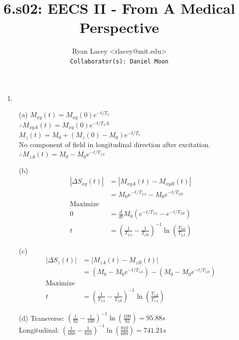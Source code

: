 \documentclass{article}
\begin{document}

\title{6.s02: EECS II - From A Medical Perspective}
\author{
  Ryan Lacey <rlacey@mit.edu>\\
  \footnotesize \texttt{Collaborator(s): Daniel Moon}
}
        
\maketitle
        

\begin{enumerate}
\item[1.]
	\begin{enumerate}
	\item[(a)]
	$M_{xy}(t) = M_{xy}(0)e^{-t/T_2}$\\
	$\therefore M_{xyA}(t) = M_{xy}(0)e^{-t/T_2A}$\\
	
	$M_z(t) = M_0 + (M_z(0) - M_0)e^{-t/T_1}$\\
	No component of field in longitudinal direction after  excitation.\\
	$\therefore M_{zA}(t) = M_0 - M_0 e^{-t/T_{1A}}$\\

	\item[(b)]
\begin{align*}
|\Delta S_{xy}(t)| &= |M_{xyA}(t) - M_{xyB}(t)|\\
&= M_{0} e^{-t/T_{2A}} - M_{0} e^{-t/T_{2B}}\\
\text{Maximize}&\\
0 &= \frac{d}{dt} M_{0} \left(e^{-t/T_{2A}} - e^{-t/T_{2B}} \right)\\
t &= \left( \frac{1}{T_{2A}} - \frac{1}{T_{2B}} \right)^{-1} \ln \left( \frac{T_{2B}}{T_{2A}} \right)
\end{align*}

	\item[(c)]
\begin{align*}
|\Delta S_{z}(t)| &= |M_{zA}(t) - M_{zB}(t)|\\
&= \left(M_0 - M_0 e^{-t/T_{1A}} \right) - \left( M_0 - M_0 e^{-t/T_{1B}} \right)\\
\text{Maximize}&\\
t &= \left( \frac{1}{T_{1A}} - \frac{1}{T_{1B}} \right)^{-1} \ln \left( \frac{T_{1B}}{T_{1A}} \right)
\end{align*}

	\item[(d)]
	Transverse: $\left( \frac{1}{92} - \frac{1}{100} \right)^{-1} \ln \left( \frac{100}{92} \right) = 95.88s$\\
	Longitudinal: $\left( \frac{1}{680} - \frac{1}{810} \right)^{-1} \ln \left( \frac{810}{680} \right) = 741.21s$
	\end{enumerate}


\end{enumerate}
\end{document}
